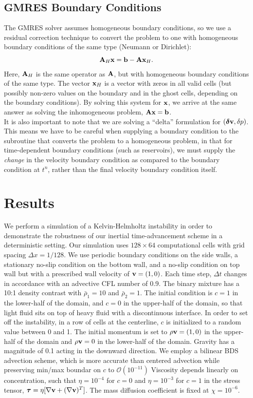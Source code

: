 \documentclass[final]{siamltex}
\def\Ab {{\bf A}}
\def\bb {{\bf b}}
\def\vb {{\bf v}}
\def\xb {{\bf x}}
\def\deltab {\boldsymbol{\delta}}
\def\taub   {\boldsymbol{\tau}}
\begin{document}
\subsection{GMRES Boundary Conditions}
The GMRES solver assumes homogeneous boundary conditions,
so we use a residual correction technique to convert the problem to one
with homogeneous boundary conditions of the same type (Neumann or Dirichlet):
\begin{equation}
\Ab_H\xb = \bb - \Ab\xb_H.
\end{equation}
Here, $\Ab_H$ is the same operator as $\Ab$, but with homogeneous boundary conditions
of the same type.
The vector $\xb_H$ is a vector with zeros in all valid cells (but possibly
non-zero values on the boundary and in the ghost cells, depending on the 
boundary conditions).
By solving this system for $\xb$, we arrive at the same answer as solving the
inhomogeneous problem, $\Ab\xb=\bb$.\\

It is also important to note that we are solving a ``delta'' formulation for
$(\deltab\vb,\delta p)$.  This means we have to be careful when supplying
a boundary condition to the subroutine that converts the problem to a homogeneous
problem, in that for time-dependent boundary conditions (such as reservoirs), we
must supply the {\it change} in the velocity boundary condition as compared to
the boundary condition at $t^n$, rather than the final velocity boundary 
condition itself.

\section{Results}
We perform a simulation of a Kelvin-Helmholtz instability in order to demonstrate
the robustness of our inertial time-advancement scheme in a deterministic setting.
Our simulation uses $128\times 64$ computational cells with grid spacing
$\Delta x=1/128$.  We use periodic boundary conditions on the side walls, a 
stationary no-slip condition on the bottom wall, and a no-slip condition on top wall
but with a prescribed wall velocity of $\vb=(1,0)$.
Each time step, $\Delta t$ changes in accordance with an
advective CFL number of 0.9.  The binary mixture has a 10:1 density contrast with
$\bar\rho_1=10$ and $\bar\rho_2=1$.  The initial condition is $c=1$ in the lower-half
of the domain, and $c=0$ in the upper-half of the domain, so that light fluid
sits on top of heavy fluid with a discontinuous interface.
In order to set off the instability, 
in a row of cells at the centerline, $c$ is initialized to a random value between 0 and 1.
The initial momentum is set to $\rho\vb=(1,0)$ in the upper-half of
the domain and $\rho\vb=0$ in the lower-half of the domain.
Gravity has a magnitude of 0.1 acting in the downward direction.
We employ a bilinear BDS advection scheme, which is more accurate than centered
advection while preserving min/max boundar on $c$ to $\mathcal O(10^{-11})$
Viscosity depends linearly on concentration, such that $\eta=10^{-4}$ for $c=0$ 
and $\eta=10^{-3}$ for $c=1$ in the stress tensor,
$\taub = \eta[\nabla\vb + (\nabla\vb)^T]$.
The mass diffusion coefficient is fixed at $\chi=10^{-6}$.
\end{document}
